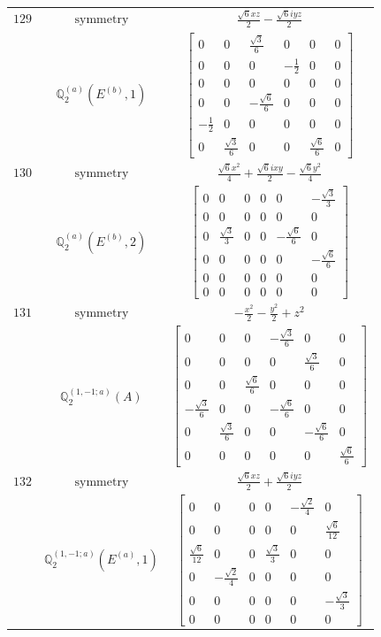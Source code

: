 \documentclass[fleqn,8pt,landscape]{jsarticle}
\begin{document}
\begin{longtable}{ccc}
$ 129 $ & $ \text{symmetry} $ & $ \frac{\sqrt{6} x z}{2} - \frac{\sqrt{6} i y z}{2} $ \\
$  $ & $ \mathbb{Q}_{2}^{(a)}(E^{(b)},1) $ & $ \begin{bmatrix} 0 & 0 & \frac{\sqrt{3}}{6} & 0 & 0 & 0 \\ 0 & 0 & 0 & - \frac{1}{2} & 0 & 0 \\ 0 & 0 & 0 & 0 & 0 & 0 \\ 0 & 0 & - \frac{\sqrt{6}}{6} & 0 & 0 & 0 \\ - \frac{1}{2} & 0 & 0 & 0 & 0 & 0 \\ 0 & \frac{\sqrt{3}}{6} & 0 & 0 & \frac{\sqrt{6}}{6} & 0 \end{bmatrix} $ \\ \hline
$ 130 $ & $ \text{symmetry} $ & $ \frac{\sqrt{6} x^{2}}{4} + \frac{\sqrt{6} i x y}{2} - \frac{\sqrt{6} y^{2}}{4} $ \\
$  $ & $ \mathbb{Q}_{2}^{(a)}(E^{(b)},2) $ & $ \begin{bmatrix} 0 & 0 & 0 & 0 & 0 & - \frac{\sqrt{3}}{3} \\ 0 & 0 & 0 & 0 & 0 & 0 \\ 0 & \frac{\sqrt{3}}{3} & 0 & 0 & - \frac{\sqrt{6}}{6} & 0 \\ 0 & 0 & 0 & 0 & 0 & - \frac{\sqrt{6}}{6} \\ 0 & 0 & 0 & 0 & 0 & 0 \\ 0 & 0 & 0 & 0 & 0 & 0 \end{bmatrix} $ \\ \hline
$ 131 $ & $ \text{symmetry} $ & $ - \frac{x^{2}}{2} - \frac{y^{2}}{2} + z^{2} $ \\
$  $ & $ \mathbb{Q}_{2}^{(1,-1;a)}(A) $ & $ \begin{bmatrix} 0 & 0 & 0 & - \frac{\sqrt{3}}{6} & 0 & 0 \\ 0 & 0 & 0 & 0 & \frac{\sqrt{3}}{6} & 0 \\ 0 & 0 & \frac{\sqrt{6}}{6} & 0 & 0 & 0 \\ - \frac{\sqrt{3}}{6} & 0 & 0 & - \frac{\sqrt{6}}{6} & 0 & 0 \\ 0 & \frac{\sqrt{3}}{6} & 0 & 0 & - \frac{\sqrt{6}}{6} & 0 \\ 0 & 0 & 0 & 0 & 0 & \frac{\sqrt{6}}{6} \end{bmatrix} $ \\ \hline
$ 132 $ & $ \text{symmetry} $ & $ \frac{\sqrt{6} x z}{2} + \frac{\sqrt{6} i y z}{2} $ \\
$  $ & $ \mathbb{Q}_{2}^{(1,-1;a)}(E^{(a)},1) $ & $ \begin{bmatrix} 0 & 0 & 0 & 0 & - \frac{\sqrt{2}}{4} & 0 \\ 0 & 0 & 0 & 0 & 0 & \frac{\sqrt{6}}{12} \\ \frac{\sqrt{6}}{12} & 0 & 0 & \frac{\sqrt{3}}{3} & 0 & 0 \\ 0 & - \frac{\sqrt{2}}{4} & 0 & 0 & 0 & 0 \\ 0 & 0 & 0 & 0 & 0 & - \frac{\sqrt{3}}{3} \\ 0 & 0 & 0 & 0 & 0 & 0 \end{bmatrix} $ \\ \hline

\end{longtable}
\end{document}
